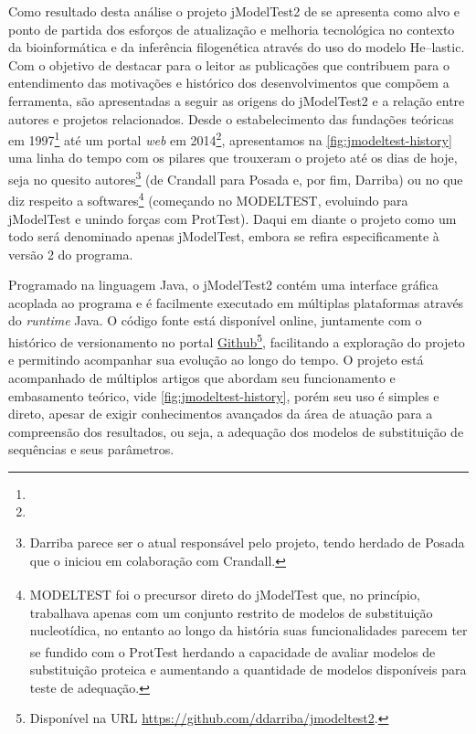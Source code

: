 \documentclass[english,brazilian]{UNISINOSmonografia} %
\begin{document}
Como resultado desta análise o projeto jModelTest2 de  se apresenta como alvo e ponto de partida dos esforços de atualização e melhoria tecnológica no contexto da bioinformática e da inferência filogenética através do uso do modelo \textsf{He}--lastic.
Com o objetivo de destacar para o leitor as publicações que contribuem para o entendimento das motivações e histórico dos desenvolvimentos que compõem a ferramenta, são apresentadas a seguir as origens do jModelTest2 e a relação entre autores e projetos relacionados.
Desde o estabelecimento das fundações teóricas em 1997\footnote{
} até um portal \textit{web} em 2014\footnote{
}, apresentamos na \autoref{fig:jmodeltest-history} uma linha do tempo com os pilares que trouxeram o projeto até os dias de hoje, seja no quesito autores\footnote{
	Darriba parece ser o atual responsável pelo projeto, tendo herdado de Posada que o iniciou em colaboração com Crandall.
} (de Crandall para Posada e, por fim, Darriba) ou no que diz respeito a softwares\footnote{
	MODELTEST\textsuperscript{\dag} foi o precursor direto do jModelTest que, no princípio, trabalhava apenas com um conjunto restrito de modelos de substituição nucleotídica, no entanto ao longo da história suas funcionalidades parecem ter se fundido com o ProtTest\textsuperscript{\dag} herdando a capacidade de avaliar modelos de substituição proteica e aumentando a quantidade de modelos disponíveis para teste de adequação.
} (começando no MODELTEST, evoluindo para jModelTest e unindo forças com ProtTest).
%
Daqui em diante o projeto como um todo será denominado apenas jModelTest, embora se refira especificamente à versão 2 do programa.


{
	\renewcommand*{\thefootnote}{\fnsymbol{footnote}}
	\addtocounter{footnote}{0}
	\renewcommand*{\thefootnote}{\arabic{footnote}}
}


Programado na linguagem Java, o jModelTest2 contém uma interface gráfica acoplada ao programa e é facilmente executado em múltiplas plataformas através do \textit{runtime} Java.
O código fonte está disponível online, juntamente com o histórico de versionamento no portal \href{https://github.com/ddarriba/jmodeltest2}{Github}\footnote{
	Disponível na URL \url{https://github.com/ddarriba/jmodeltest2}.
}, facilitando a exploração do projeto e permitindo acompanhar sua evolução ao longo do tempo.
O projeto está acompanhado de múltiplos artigos que abordam seu funcionamento e embasamento teórico, vide \autoref{fig:jmodeltest-history},
porém seu uso é simples e direto, apesar de exigir conhecimentos avançados da área de atuação para a compreensão dos resultados, ou seja, a adequação dos modelos de substituição de sequências e seus parâmetros.
\end{document}
